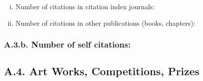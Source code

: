 \documentclass[12pt]{article}
\begin{document}
\begin{enumerate}[i)]

\item  Number of citations in citation index journals:	
\item Number of citations in other publications (books, chapters):	

\end{enumerate}

\subsubsection*{A.3.b. Number of self citations:}

\subsection*{A.4. Art Works, Competitions, Prizes}



\end{document}
